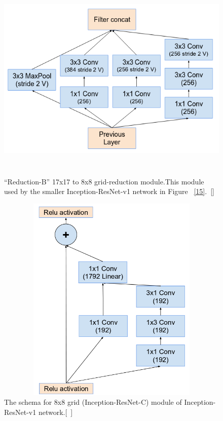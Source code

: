 \documentclass[a4paper,12pt, twoside]{NITKReport}
\begin{document}
\begin{figure}

\centering
\includegraphics[height=10cm,width=13cm]{figure12.png}
    \caption{“Reduction-B” 17x17 to 8x8 grid-reduction module.This module used by the smaller Inception-ResNet-v1 network in Figure ~\ref{15}.~[\cite{szegedy2017inception}]}
\label{12}
\end{figure}

\begin{figure}[h]
  \centering
    
    \includegraphics[height=10cm,width=13cm]{figure13.png}
    \caption{ The schema for 8x8 grid (Inception-ResNet-C) module of Inception-ResNet-v1 network.[~\cite{szegedy2017inception}]}
    \label{13}
   \end{figure}
 
\end{document}
